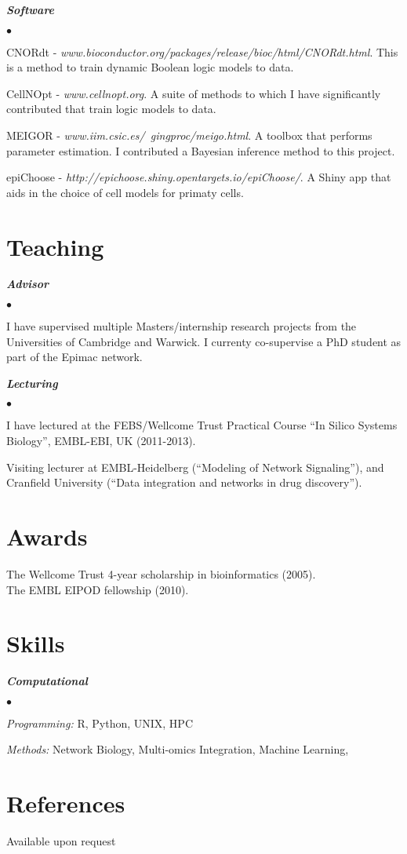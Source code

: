 \documentclass[overlapped, line, 11pt, letterpaper]{res}
\renewenvironment{itemize}{
\begin{list}{$\bullet$}
{\setlength{\itemsep}{0cm}}
}{\end{list}}
\begin{document}
\begin{resume}
\textbf{\emph{Software}}
\begin{itemize}
\item CNORdt - \emph{www.bioconductor.org/packages/release/bioc/html/CNORdt.html}. This is a method to train dynamic Boolean logic models to data.
\item CellNOpt - \emph{www.cellnopt.org}. A suite of methods to which I have significantly contributed that train logic models to data.
\item MEIGOR - \emph{www.iim.csic.es/~gingproc/meigo.html}. A toolbox that performs parameter estimation. I contributed a Bayesian inference method to this project.
\item epiChoose - \emph{http://epichoose.shiny.opentargets.io/epiChoose/}. A Shiny app that aids in the choice of cell models for primaty cells.
\end{itemize}

\section{\bf Teaching}
\textbf{\emph{Advisor}}
\begin{itemize}
\item I have supervised multiple Masters/internship research projects from the Universities of Cambridge and Warwick. I currenty co-supervise a PhD student as part of the Epimac network.
\end{itemize}
\textbf{\emph{Lecturing}}
\begin{itemize}
\item I have lectured at the FEBS/Wellcome Trust Practical Course ``In Silico Systems Biology'', EMBL-EBI, UK (2011-2013).
\item Visiting lecturer at EMBL-Heidelberg  (``Modeling of Network Signaling''), and Cranfield University (``Data integration and networks in drug discovery'').
\end{itemize}

\section{Awards}
The Wellcome Trust 4-year scholarship in bioinformatics (2005). \\
The EMBL EIPOD fellowship (2010).

\section{Skills}
\textbf{\emph{Computational}}
\begin{itemize}
\item \emph{Programming:} R, Python, UNIX, HPC 
\item \emph{Methods:} Network Biology, Multi-omics Integration, Machine Learning,  
\end{itemize}

\section{References}
Available upon request

\end{resume}
\end{document}
